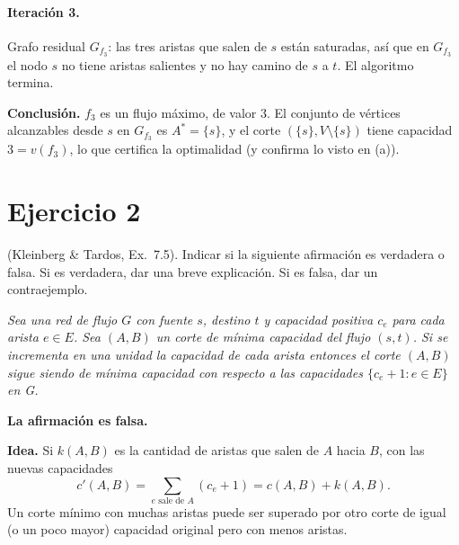 \paragraph{Iteración 3.} Grafo residual $G_{f_3}$: las tres aristas que salen de $s$ están saturadas, así que en $G_{f_3}$ el nodo $s$ no tiene aristas salientes y no hay camino de $s$ a $t$. El algoritmo termina.

\begin{center}
\end{center}

\textbf{Conclusión.} $f_3$ es un flujo máximo, de valor $3$. El conjunto de vértices alcanzables desde $s$ en $G_{f_3}$ es $A^\ast=\{s\}$, y el corte $(\{s\},V\setminus\{s\})$ tiene capacidad $3=v(f_3)$, lo que certifica la optimalidad (y confirma lo visto en (a)).

\section{Ejercicio 2}
\begin{enunciado}
(Kleinberg \& Tardos, Ex.~7.5). Indicar si la siguiente afirmación es verdadera o falsa. Si es verdadera, dar una breve explicación. Si es falsa, dar un contraejemplo.

\emph{Sea una red de flujo $G$ con fuente $s$, destino $t$ y capacidad positiva $c_e$ para cada arista $e\in E$. Sea $(A,B)$ un corte de mínima capacidad del flujo $(s,t)$. Si se incrementa en una unidad la capacidad de cada arista entonces el corte $(A,B)$ sigue siendo de mínima capacidad con respecto a las capacidades $\{c_e+1 : e\in E\}$ en G.}
\end{enunciado}


\textbf{La afirmación es falsa.}

\textbf{Idea.} Si $k(A,B)$ es la cantidad de aristas que salen de $A$ hacia $B$, con las nuevas capacidades
\[ c'(A,B)=\sum_{e \text{ sale de } A}(c_e+1)=c(A,B)+k(A,B). \]
Un corte mínimo con muchas aristas puede ser superado por otro corte de igual (o un poco mayor) capacidad original pero con menos aristas.

